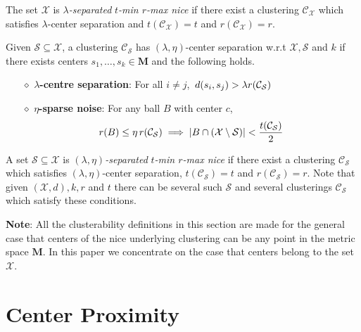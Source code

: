 \documentclass[anon,12pt]{colt2016} %
\newcommand{\mc}{\mathcal}
\newcommand{\mb}{\mathbf}
\begin{document}
\noindent The set $\mc X$ is {\it $\lambda$-separated} {\it $t$-min $r$-max nice} if there exist a clustering $\mc C_{\mc X}$ which satisfies $\lambda$-center separation and $t(\mc{C}_{\mc{X}}) = t$ and $r(\mc{C}_\mc{X}) = r$.

\begin{definition}
Given $\mc S \subseteq \mc X$, a clustering $\mc C_{\mc S}$ has $(\lambda, \eta)$-center separation w.r.t $\mc X, \mc S$ and $k$ if there exists centers $s_1, \ldots, s_k \in \mb M$ and the following holds.

\begin{itemize}[nolistsep, noitemsep]
\label{defn:lambdacsnoise}	

\item[$\diamond$] {\bf $\lambda$-centre separation}: For all $i\neq j$, $\thinspace d(s_i, s_j) > \lambda r({\mc C}_{\mc S})$
\item[$\diamond$]{\bf $\eta$-sparse noise}: For any ball $B$ with center $c$, 
\vspace{-0.1in}\begin{align*}
r(B)\leq \eta \thinspace r(\mc{C}_{\mc S}) \implies |B\cap (\mc X\setminus \mc S)| < \frac{t(\mc C_{\mc S})}{2}
\end{align*}
\end{itemize}
\end{definition}

\noindent A set $\mc S \subseteq \mc X$ is {\it $(\lambda, \eta)$-separated} {\it $t$-min $r$-max nice} if there exist a clustering $\mc C_{\mc S}$ which satisfies $(\lambda, \eta)$-center separation,  $t({\mc C}_{\mc S}) = t$ and $r({\mc C}_{\mc S}) = r$. Note that given $(\mc X, d), k, r$ and $t$ there can be several such $\mc S$ and several clusterings $\mc C_{\mc S}$ which satisfy these conditions.

\noindent \textbf{Note}: All the clusterability definitions in this section are made for the general case that centers of the nice underlying clustering can be any point in the metric space $\mb M$. In this paper we concentrate on the case that centers belong to the set $\mc X$.
\section{Center Proximity}
\label{section:cp}
\end{document}
